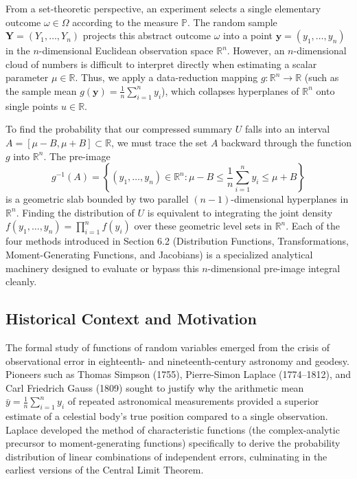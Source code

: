 \documentclass[11pt, letterpaper]{article}
\theoremstyle{definition}
\theoremstyle{remark}
\newcommand{\R}{\mathbb{R}}
\newcommand{\Prob}{\mathbb{P}}
\begin{document}
From a set-theoretic perspective, an experiment selects a single elementary outcome $\omega \in \Omega$ according to the measure $\Prob$. The random sample $\mathbf{Y} = (Y_1, \dots, Y_n)$ projects this abstract outcome $\omega$ into a point $\mathbf{y} = (y_1, \dots, y_n)$ in the $n$-dimensional Euclidean observation space $\R^n$. However, an $n$-dimensional cloud of numbers is difficult to interpret directly when estimating a scalar parameter $\mu \in \R$. Thus, we apply a data-reduction mapping $g : \R^n \to \R$ (such as the sample mean $g(\mathbf{y}) = \frac{1}{n}\sum_{i=1}^n y_i$), which collapses hyperplanes of $\R^n$ onto single points $u \in \R$.

To find the probability that our compressed summary $U$ falls into an interval $A = [\mu - B, \mu + B] \subset \R$, we must trace the set $A$ backward through the function $g$ into $\R^n$. The pre-image
\[
    g^{-1}(A) = \left\{(y_1, \dots, y_n) \in \R^n : \mu - B \le \frac{1}{n}\sum_{i=1}^{n} y_i \le \mu + B\right\}
\]
is a geometric slab bounded by two parallel $(n-1)$-dimensional hyperplanes in $\R^n$. Finding the distribution of $U$ is equivalent to integrating the joint density $f(y_1, \dots, y_n) = \prod_{i=1}^n f(y_i)$ over these geometric level sets in $\R^n$. Each of the four methods introduced in Section 6.2 (Distribution Functions, Transformations, Moment-Generating Functions, and Jacobians) is a specialized analytical machinery designed to evaluate or bypass this $n$-dimensional pre-image integral cleanly.

\subsection{Historical Context and Motivation}

The formal study of functions of random variables emerged from the crisis of observational error in eighteenth- and nineteenth-century astronomy and geodesy. Pioneers such as Thomas Simpson (1755), Pierre-Simon Laplace (1774--1812), and Carl Friedrich Gauss (1809) sought to justify why the arithmetic mean $\bar{y} = \frac{1}{n}\sum_{i=1}^n y_i$ of repeated astronomical measurements provided a superior estimate of a celestial body's true position compared to a single observation. Laplace developed the method of characteristic functions (the complex-analytic precursor to moment-generating functions) specifically to derive the probability distribution of linear combinations of independent errors, culminating in the earliest versions of the Central Limit Theorem.
\end{document}
